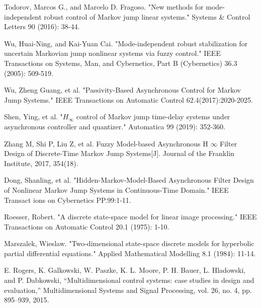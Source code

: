 \documentclass[conference]{IEEEtran}
\begin{document}

%
%


\begin{thebibliography}{1}
	
	Todorov, Marcos G., and Marcelo D. Fragoso. "New methods for mode-independent robust control of Markov jump linear systems." Systems \& Control Letters 90 (2016): 38-44.
	
	Wu, Huai-Ning, and Kai-Yuan Cai. "Mode-independent robust stabilization for uncertain Markovian jump nonlinear systems via fuzzy control." IEEE Transactions on Systems, Man, and Cybernetics, Part B (Cybernetics) 36.3 (2005): 509-519.
	
	
	Wu, Zheng Guang, et al. "Passivity-Based Asynchronous Control for Markov Jump Systems." IEEE Transactions on Automatic Control 62.4(2017):2020-2025.
	
	Shen, Ying, et al. "$H_\infty$ control of Markov jump time-delay systems under asynchronous controller and quantizer." Automatica 99 (2019): 352-360.
	
	Zhang M, Shi P, Liu Z, et al. Fuzzy Model-based Asynchronous H $\infty$ Filter Design of Discrete-Time Markov Jump Systems[J]. Journal of the Franklin Institute, 2017, 354(18).
	
	Dong, Shanling, et al. "Hidden-Markov-Model-Based Asynchronous Filter Design of Nonlinear Markov Jump Systems in Continuous-Time Domain." IEEE Transact  ions on Cybernetics PP.99:1-11.
	
	Roesser, Robert. "A discrete state-space model for linear image processing." IEEE Transactions on Automatic Control 20.1 (1975): 1-10.
	
	Marszalek, Wieslaw. "Two-dimensional state-space discrete models for hyperbolic partial differential equations." Applied Mathematical Modelling 8.1 (1984): 11-14.
	
	E. Rogers, K. Galkowski, W. Paszke, K. L. Moore, P. H. Bauer, L. Hladowski, and P. Dabkowski, “Multidimensional control systems: case studies in design and evaluation,” Multidimensional Systems and Signal Processing, vol. 26, no. 4, pp. 895–939, 2015.
	

\end{thebibliography}
\end{document}
